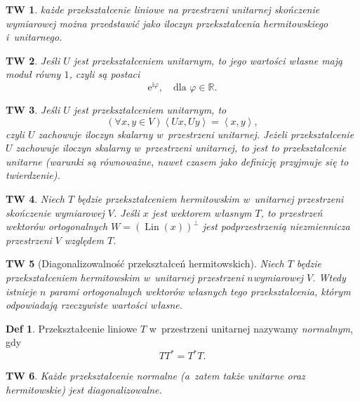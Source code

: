 \documentclass[a4paper, 12pt]{mwart}
\DeclareMathOperator{\Lin}{Lin}
\newcommand*{\iu}{\mathrm{i}}
\newcommand*{\e}{\mathrm{e}}
\theoremstyle{definition}
\newtheorem{definicja}{Def}[section]
\theoremstyle{plain}
\newtheorem{twierdzenie}{TW}[section]
\theoremstyle{remark}
\begin{document}
\begin{twierdzenie}
	każde przekształcenie liniowe na przestrzeni unitarnej skończenie wymiarowej można przedstawić jako iloczyn przekształcenia hermitowskiego i~unitarnego.
\end{twierdzenie}
\begin{twierdzenie}
	Jeśli $U$ jest przekształceniem unitarnym, to jego wartości własne mają moduł równy $1$, czyli są postaci
	\begin{equation}
		\e^{\iu\varphi}, \quad \text{dla } \varphi \in \mathbb{R}.
	\end{equation}
\end{twierdzenie}
\begin{twierdzenie}
	Jeśli $U$ jest przekształceniem unitarnym, to
	\begin{equation}
		\left(\forall x, y \in V\right) \left<Ux, Uy\right> = \left<x, y\right>,
	\end{equation}
	czyli $U$ zachowuje iloczyn skalarny w~przestrzeni unitarnej. Jeżeli przekształcenie $U$ zachowuje iloczyn skalarny w~przestrzeni unitarnej, to jest to przekształcenie unitarne (warunki są równoważne, nawet czasem jako definicję przyjmuje się to twierdzenie).
\end{twierdzenie}
\begin{twierdzenie}
	Niech $T$ będzie przekształceniem hermitowskim w~unitarnej przestrzeni skończenie wymiarowej $V$. Jeśli $x$ jest wektorem własnym $T$, to przestrzeń wektorów ortogonalnych $W = {(\Lin(x))}^\perp$ jest podprzestrzenią niezmiennicza przestrzeni $V$ względem $T$.
\end{twierdzenie}
\begin{twierdzenie}[Diagonalizowalność przekształceń hermitowskich]
	Niech $T$ będzie przekształceniem hermitowskim w~unitarnej przestrzeni $n$\dywiz wymiarowej $V$. Wtedy istnieje $n$  parami ortogonalnych wektorów własnych tego przekształcenia, którym odpowiadają rzeczywiste wartości własne.
\end{twierdzenie}
\begin{definicja}
	Przekształcenie liniowe $T$ w~przestrzeni unitarnej nazywamy \emph{normalnym}, gdy
	\begin{equation}
		TT^* = T^*T.
	\end{equation}
\end{definicja}
\begin{twierdzenie}
	Każde przekształcenie normalne (a~zatem także unitarne oraz hermitowskie) jest diagonalizowalne.
\end{twierdzenie}
\end{document}

